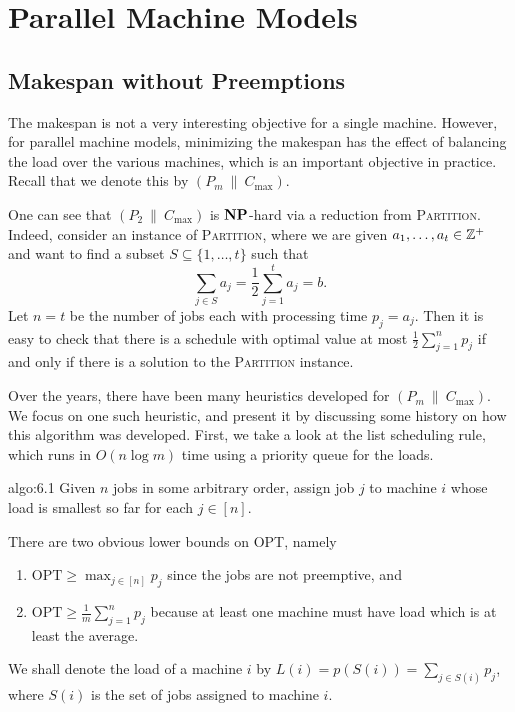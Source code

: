 \section{Parallel Machine Models} \label{sec:6}

\subsection{Makespan without Preemptions} \label{subsec:6.1}
The makespan is not a very interesting objective for a single machine. 
However, for parallel machine models, minimizing the makespan has the effect 
of balancing the load over the various machines, which is an important 
objective in practice. Recall that we denote this by $(P_m~\|~C_{\max})$.

One can see that $(P_2~\|~C_{\max})$ is $\operatorname{\textbf{NP}}$-hard via a reduction from 
\textsc{Partition}. Indeed, consider an instance of \textsc{Partition}, 
where we are given $a_1, \dots, a_t \in \mathbb{Z}^+$ and want to find a subset 
$S \subseteq \{1, \dots, t\}$ such that 
\[ \sum_{j\in S} a_j = \frac12 \sum_{j=1}^t a_j = b. \] 
Let $n = t$ be the number of jobs each with processing time $p_j = a_j$. Then 
it is easy to check that there is a schedule with optimal value at most 
$\frac12 \sum_{j=1}^n p_j$ if and only if there is a solution to the 
\textsc{Partition} instance. 

Over the years, there have been many heuristics developed for 
$(P_m~\|~C_{\max})$. We focus on one such heuristic, and present it by 
discussing some history on how this algorithm was developed. First, we 
take a look at the list scheduling rule, which runs in $O(n\log m)$ time 
using a priority queue for the loads. 

\begin{algo}{algo:6.1}
    Given $n$ jobs in some arbitrary order, assign job $j$ to machine $i$ 
    whose load is smallest so far for each $j \in [n]$. 
\end{algo}

There are two obvious lower bounds on OPT, namely 
\begin{enumerate}[(1)]
    \item $\text{OPT} \geq \max_{j\in[n]} p_j$ since the jobs are not preemptive, and 
    \item $\text{OPT} \geq \frac1m \sum_{j=1}^n p_j$ because at least one machine must 
    have load which is at least the average. 
\end{enumerate}
We shall denote the load of a machine $i$ by $L(i) = p(S(i)) = 
\sum_{j\in S(i)} p_j$, where $S(i)$ is the set of jobs assigned to machine $i$.

